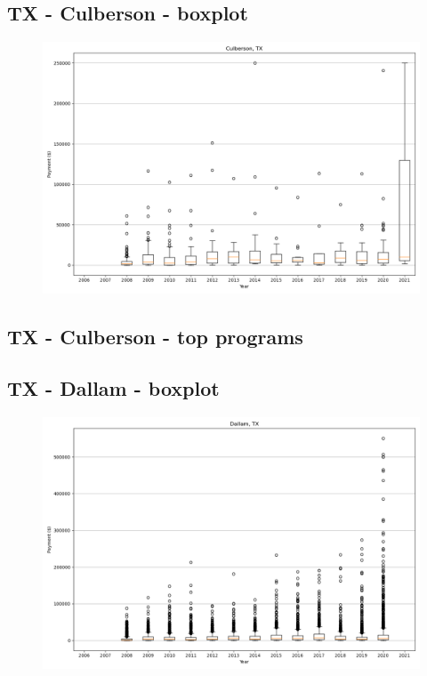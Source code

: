 \subsection*{TX - Culberson - boxplot}
\begin{figure}[h]
\centering
\includegraphics[width=7in]{../output/boxplots/counties/Culberson-TX_boxplot.png}
\end{figure}


\subsection*{TX - Culberson - top programs}

\newpage
\subsection*{TX - Dallam - boxplot}
\begin{figure}[h]
\centering
\includegraphics[width=7in]{../output/boxplots/counties/Dallam-TX_boxplot.png}
\end{figure}


